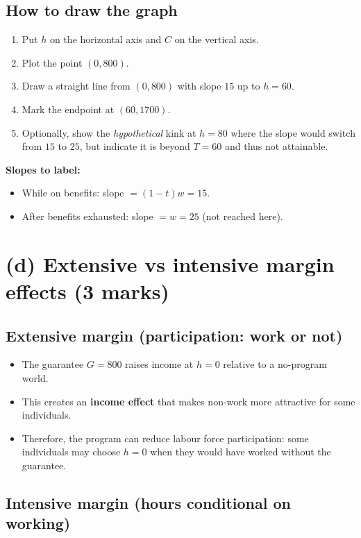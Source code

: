 \documentclass[12pt]{article}
\begin{document}
\subsection*{How to draw the graph}

\begin{enumerate}
\item Put $h$ on the horizontal axis and $C$ on the vertical axis.
\item Plot the point $(0,800)$.
\item Draw a straight line from $(0,800)$ with slope $15$ up to $h=60$.
\item Mark the endpoint at $(60,1700)$.
\item Optionally, show the \emph{hypothetical} kink at $h=80$ where the slope would switch from $15$ to $25$, but indicate it is beyond $T=60$ and thus not attainable.
\end{enumerate}

\textbf{Slopes to label:}
\begin{itemize}
\item While on benefits: slope $=(1-t)w = 15$.
\item After benefits exhausted: slope $=w=25$ (not reached here).
\end{itemize}

\section*{(d) Extensive vs intensive margin effects (3 marks)}

\subsection*{Extensive margin (participation: work or not)}

\begin{itemize}
\item The guarantee $G=800$ raises income at $h=0$ relative to a no-program world.
\item This creates an \textbf{income effect} that makes non-work more attractive for some individuals.
\item Therefore, the program can reduce labour force participation: some individuals may choose $h=0$ when they would have worked without the guarantee.
\end{itemize}

\subsection*{Intensive margin (hours conditional on working)}
\end{document}

